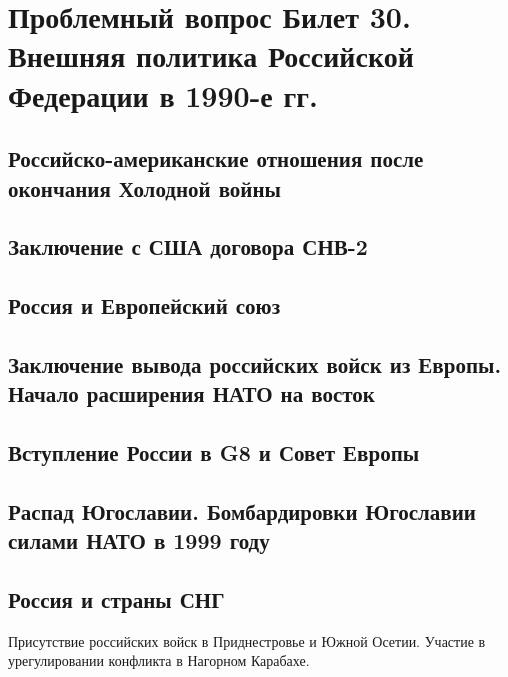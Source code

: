\section{\textbf{Проблемный вопрос} Билет 30. Внешняя политика Российской Федерации в 1990-е гг.}
\subsection{Российско-американские отношения после окончания Холодной войны}
\subsection{Заключение с США договора СНВ-2}
\subsection{Россия и Европейский союз}
\subsection{Заключение вывода российских войск из Европы. Начало расширения НАТО на восток}
\subsection{Вступление России в G8 и Совет Европы}
\subsection{Распад Югославии. Бомбардировки Югославии силами НАТО в 1999 году}
\subsection{Россия и страны СНГ}
Присутствие российских войск в Приднестровье и Южной Осетии. Участие в урегулировании конфликта в Нагорном Карабахе.